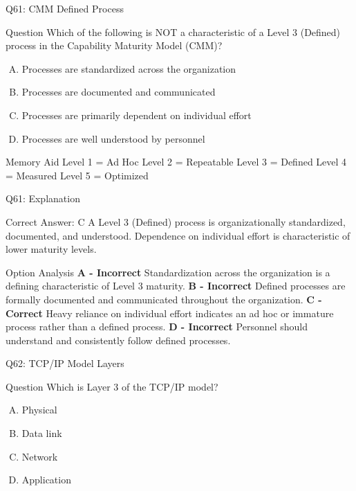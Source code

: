 \documentclass{beamer}
\begin{document}
	\begin{frame}{Q61: CMM Defined Process} \begin{block}{Question} Which of the following is NOT a characteristic of a Level 3 (Defined) process in the Capability Maturity Model (CMM)? \end{block} \begin{enumerate}[(A)] \item Processes are standardized across the organization \item Processes are documented and communicated \item Processes are primarily dependent on individual effort \item Processes are well understood by personnel \end{enumerate} 
	
	\begin{block}{Memory Aid} Level 1 = Ad Hoc Level 2 = Repeatable Level 3 = Defined Level 4 = Measured Level 5 = Optimized \end{block} 
	
	\end{frame} \begin{frame}{Q61: Explanation} \footnotesize \begin{block}{Correct Answer: C} A Level 3 (Defined) process is organizationally standardized, documented, and understood. Dependence on individual effort is characteristic of lower maturity levels. \end{block} \begin{block}{Option Analysis} \textbf{A - Incorrect} Standardization across the organization is a defining characteristic of Level 3 maturity. \vspace{0.15cm} \textbf{B - Incorrect} Defined processes are formally documented and communicated throughout the organization. \vspace{0.15cm} \textbf{C - Correct} Heavy reliance on individual effort indicates an ad hoc or immature process rather than a defined process. \vspace{0.15cm} \textbf{D - Incorrect} Personnel should understand and consistently follow defined processes. \end{block} \end{frame}
	
	
	\begin{frame}{Q62: TCP/IP Model Layers}
		\begin{block}{Question}
			Which is Layer 3 of the TCP/IP model?
		\end{block}
		\begin{enumerate}[(A)]
			\item Physical
			\item Data link
			\item Network
			\item Application
		\end{enumerate}
	\end{frame}
	
\end{document}
